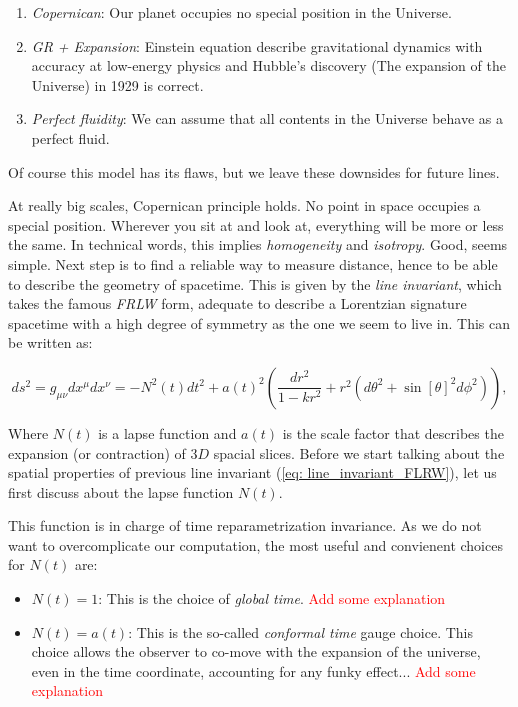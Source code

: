 \documentclass[11pt, a4paper]{article} %
\begin{document}
\begin{enumerate}
	\item \textit{Copernican}: Our planet occupies no special position in the Universe.
	\item \textit{GR + Expansion}: Einstein equation describe gravitational dynamics with accuracy at low-energy physics and Hubble's discovery (The expansion of the Universe) in 1929 is correct.
	\item \textit{Perfect fluidity}: We can assume that all contents in the Universe behave as a perfect fluid.
\end{enumerate}

Of course this model has its flaws, but we leave these downsides for future lines.

At really big scales, Copernican principle holds. No point in space occupies a special position. Wherever you sit at and look at, everything will be more or less the same. In technical words, this implies \textit{homogeneity} and \textit{isotropy}. Good, seems simple. Next step is to find a reliable way to measure distance, hence to be able to describe the geometry of spacetime. This is given by the \textit{line invariant}, which takes the famous \textit{FRLW} form, adequate to describe a Lorentzian signature spacetime with a high degree of symmetry as the one we seem to live in. This can be written as:

\begin{equation}\label{eq: line_invariant_FLRW}
	ds^{2} = g_{\mu \nu} dx^{\mu} dx^{\nu} = - N^{2}(t) dt^{2} + a(t)^2 \left(\frac{dr^{2}}{1- k r^{2}}+ r^{2} \left(d\theta^{2} + \sin[\theta]^{2} d\phi^{2}\right)\right),
\end{equation}

Where $N(t)$ is a lapse function and $a(t)$ is the scale factor that describes the expansion (or contraction) of $3D$ spacial slices. Before we start talking about the spatial properties of previous line invariant (\ref{eq: line_invariant_FLRW}), let us first discuss about the lapse function $N(t)$. 

This function is in charge of time reparametrization invariance. As we do not want to overcomplicate our computation, the most useful and convienent choices for $N(t)$ are:

\begin{itemize}
	\item $N(t) = 1$: This is the choice of \textit{global time}. \textcolor{red}{Add some explanation}
	\item $N(t) = a(t)$: This is the so-called \textit{conformal time} gauge choice. This choice allows the observer to co-move with the expansion of the universe, even in the time coordinate, accounting for any funky effect... \textcolor{red}{Add some explanation}
\end{itemize}
\end{document}

